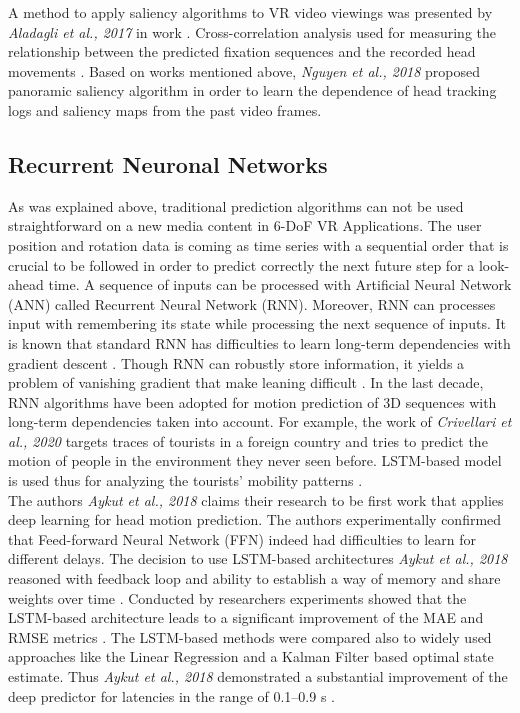 A method to apply saliency algorithms to VR video viewings was presented by \textit{Aladagli et al., 2017} in work \cite{predicting_360}. Cross-correlation analysis used for measuring the relationship between the predicted fixation sequences and the recorded head movements \cite{predicting_360}. Based on works mentioned above, \textit{Nguyen et al., 2018} proposed panoramic saliency algorithm in order to learn the dependence of head tracking logs and saliency maps from the past video frames.\\

\subsection{Recurrent Neuronal Networks}
\label{sec:related:deep}
As was explained above, traditional prediction algorithms can not be used straightforward on a new media content in 6-DoF VR Applications. The user position and rotation data is coming as time series with a sequential order that is crucial to be followed in order to predict correctly the next future step for a look-ahead time. A sequence of inputs can be processed with Artificial Neural Network (ANN) called Recurrent Neural Network (RNN). Moreover, RNN can processes input with remembering its state while processing the next sequence of inputs. It is known that standard RNN has difficulties to learn long-term dependencies with gradient descent \cite{rnn_difficults}. Though RNN can robustly store information, it yields a problem of vanishing gradient that make leaning difficult \cite{rnn_difficults}. In the last decade, RNN algorithms have been adopted for motion prediction of 3D sequences with long-term dependencies taken into account. For example, the work of \textit{Crivellari et al., 2020} targets traces of tourists in a foreign country and tries to predict the motion of people in the environment they never seen before. LSTM-based model is used thus for analyzing the tourists’ mobility patterns \cite{tourist_traces}.\\
The authors \textit{Aykut et al., 2018} claims their research to be first work that applies deep learning for head motion prediction. The authors experimentally confirmed that Feed-forward Neural Network (FFN) indeed had difficulties to learn for different delays. The decision to use LSTM-based architectures \textit{Aykut et al., 2018} reasoned with feedback loop and ability to establish a way of memory and share weights over time \cite{delay_compensation_360}. Conducted by researchers experiments showed that the LSTM-based architecture leads to a significant improvement of the MAE and RMSE metrics \cite{delay_compensation_360}. The LSTM-based methods were compared also to widely used approaches like the Linear Regression and a Kalman Filter based optimal state estimate. Thus \textit{Aykut et al., 2018} demonstrated a substantial improvement of the deep predictor for latencies in the range of 0.1–0.9 s \cite{delay_compensation_360}.\\
